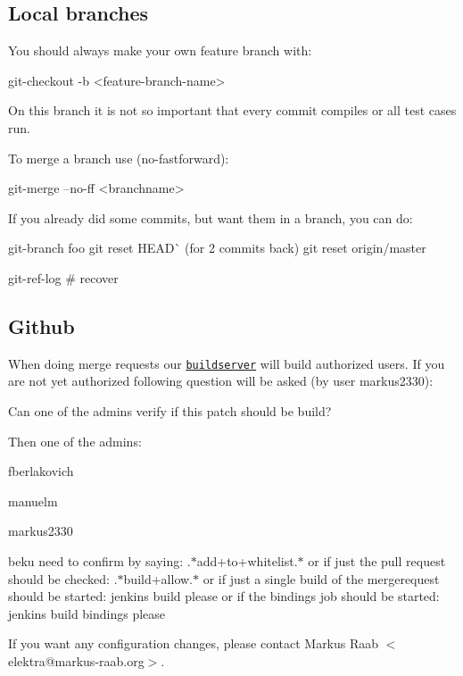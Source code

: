 \subsection*{Local branches}

You should always make your own feature branch with\+: \begin{DoxyVerb}    git-checkout -b <feature-branch-name>
\end{DoxyVerb}


On this branch it is not so important that every commit compiles or all test cases run.

To merge a branch use (no-\/fastforward)\+: \begin{DoxyVerb}    git-merge --no-ff <branchname>
\end{DoxyVerb}


If you already did some commits, but want them in a branch, you can do\+: \begin{DoxyVerb}    git-branch foo  
    git reset HEAD^^  (for 2 commits back)  
    git reset origin/master  

    git-ref-log # recover
\end{DoxyVerb}


\subsection*{Github}

When doing merge requests our \href{http://build.libelektra.org:8080}{\tt buildserver} will build authorized users. If you are not yet authorized following question will be asked (by user markus2330)\+: \begin{DoxyVerb}    Can one of the admins verify if this patch should be build?
\end{DoxyVerb}


Then one of the admins\+:
\begin{DoxyItemize}
\item fberlakovich
\item manuelm
\item markus2330
\item beku need to confirm by saying\+: .$\ast$add+to+whitelist.$\ast$ or if just the pull request should be checked\+: .$\ast$build+allow.$\ast$ or if just a single build of the mergerequest should be started\+: jenkins build please or if the bindings job should be started\+: jenkins build bindings please
\end{DoxyItemize}

If you want any configuration changes, please contact {\ttfamily Markus Raab $<$elektra@markus-\/raab.\+org$>$}. 